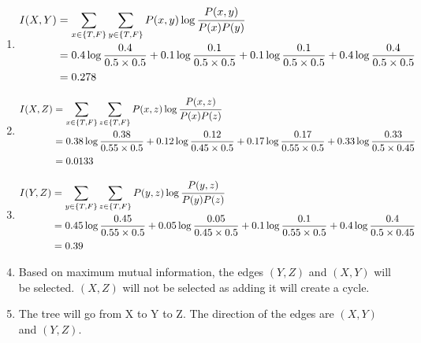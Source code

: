 \documentclass[a4paper]{article}
\theoremstyle{definition}
\newenvironment{soln}{
	\leavevmode\color{blue}\ignorespaces
}{}
\begin{document}
\begin{soln}
\begin{enumerate}
	\item
	\begin{align*}
		I(X,Y) &= \sum_{x \in \{T,F\}} \sum_{y \in \{T,F\}} P(x,y) \log \cfrac{P(x,y)}{P(x)P(y)} \\
		&= 0.4 \log \frac{0.4}{0.5 \times 0.5} + 0.1 \log \frac{0.1}{0.5 \times 0.5} + 0.1 \log \frac{0.1}{0.5 \times 0.5} + 0.4 \log \frac{0.4}{0.5 \times 0.5} \\
		&= 0.278
	\end{align*}
	\item 
	\begin{align*}
		I(X, Z) &= \sum_{x \in \{T,F\}} \sum_{z \in \{T,F\}} P(x,z) \log \cfrac{P(x,z)}{P(x)P(z)} \\
		&= 0.38 \log \frac{0.38}{0.55 \times 0.5} + 0.12 \log \frac{0.12}{0.45 \times 0.5} + 0.17 \log \frac{0.17}{0.55 \times 0.5} + 0.33 \log \frac{0.33}{0.5 \times 0.45} \\
		&= 0.0133	
	\end{align*}
	\item 
	\begin{align*}
		I(Y, Z) &= \sum_{y \in \{T,F\}} \sum_{z \in \{T,F\}} P(y,z) \log \cfrac{P(y,z)}{P(y)P(z)} \\
		&= 0.45 \log \frac{0.45}{0.55 \times 0.5} + 0.05 \log \frac{0.05}{0.45 \times 0.5} + 0.1 \log \frac{0.1}{0.55 \times 0.5} + 0.4 \log \frac{0.4}{0.5 \times 0.45} \\
		&= 0.39
	\end{align*}
	\item Based on maximum mutual information, the edges $(Y,Z)$ and $(X,Y)$ will be selected. $(X,Z)$ will not be selected as adding it will create a cycle.
	\item The tree will go from X to Y to Z. The direction of the edges are $(X,Y)$ and $(Y,Z)$.
\end{enumerate}
\end{soln}

	
	
\end{document}
